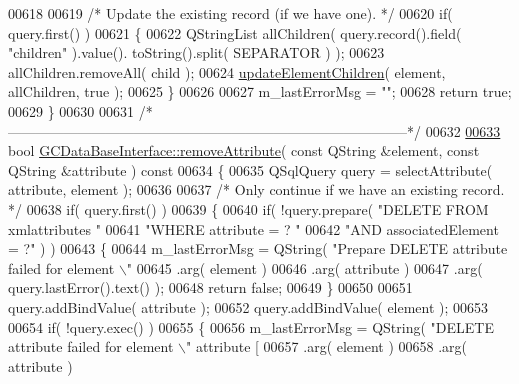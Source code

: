 \begin{DoxyCode}
{{{{{{{{{{{{{{{{{{{{{{{{{{{00618 
00619   \textcolor{comment}{/* Update the existing record (if we have one). */}
00620   \textcolor{keywordflow}{if}( query.first() )
00621   \{
00622     QStringList allChildren( query.record().field( \textcolor{stringliteral}{"children"} ).value().
      toString().split( SEPARATOR ) );
00623     allChildren.removeAll( child );
00624     \hyperlink{class_g_c_data_base_interface_a91a60134bfb21a3f49d826340bebb852}{updateElementChildren}( element, allChildren, \textcolor{keyword}{true} );
00625   \}
00626 
00627   m\_lastErrorMsg = \textcolor{stringliteral}{""};
00628   \textcolor{keywordflow}{return} \textcolor{keyword}{true};
00629 \}
00630 
00631 \textcolor{comment}{/*
      --------------------------------------------------------------------------------------*/}
00632 
\hypertarget{gcdatabaseinterface_8cpp_source_l00633}{}\hyperlink{class_g_c_data_base_interface_a6fbf551a825c0fca13926449be4a5215}{00633} \textcolor{keywordtype}{bool} \hyperlink{class_g_c_data_base_interface_a6fbf551a825c0fca13926449be4a5215}{GCDataBaseInterface::removeAttribute}( \textcolor{keyword}{const} QString &element, \textcolor{keyword}{const} 
      QString &attribute )\textcolor{keyword}{ const}
00634 \textcolor{keyword}{}\{    
00635   QSqlQuery query = selectAttribute( attribute, element );
00636 
00637   \textcolor{comment}{/* Only continue if we have an existing record. */}
00638   \textcolor{keywordflow}{if}( query.first() )
00639   \{
00640     \textcolor{keywordflow}{if}( !query.prepare( \textcolor{stringliteral}{"DELETE FROM xmlattributes "}
00641                         \textcolor{stringliteral}{"WHERE attribute = ? "}
00642                         \textcolor{stringliteral}{"AND associatedElement = ?"} ) )
00643     \{
00644       m\_lastErrorMsg = QString( \textcolor{stringliteral}{"Prepare DELETE attribute failed for element \(\backslash\)"
00645                        .arg( element )
00646                        .arg( attribute )
00647                        .arg( query.lastError().text() );
00648       \textcolor{keywordflow}{return} \textcolor{keyword}{false};
00649     \}
00650 
00651     query.addBindValue( attribute );
00652     query.addBindValue( element );
00653 
00654     \textcolor{keywordflow}{if}( !query.exec() )
00655     \{
00656       m\_lastErrorMsg = QString( \textcolor{stringliteral}{"DELETE attribute failed for element \(\backslash\)"%
       attribute [%
00657                        .arg( element )
00658                        .arg( attribute )
}}}}}}}}}}}}}}}}}}}}}}}}}}}}}
\end{DoxyCode}

